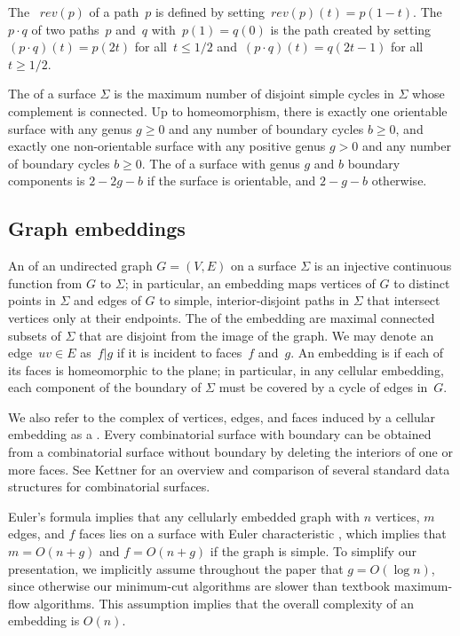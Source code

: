 \documentclass[letterpaper,review]{siamart190516}
\def\rev{\mathit{rev}}
\def\anote#1{\color{purple}Amir: #1 \color{black}}
\def\jnote#1{\textcolor{orange}{Jeff: #1}}
\begin{document}
The ~$\rev(p)$ of a path~$p$ is defined by
setting~$\rev(p)(t) = p(1-t)$. The ~$p \cdot q$ of two
paths~$p$ and~$q$ with~$p(1)=q(0)$ is the path created by
setting~$(p\cdot q)(t) = p(2t)$ for all~$t \leq 1/2$
and~$(p\cdot q)(t) = q(2t-1)$ for all~$t \geq 1/2$.

The  of a surface $\Sigma$ is the maximum number of disjoint simple cycles in $\Sigma$ whose complement is connected.
 Up to homeomorphism,
there is exactly one orientable surface with any genus $g\ge 0$ and any number of
boundary cycles $b\ge 0$, and exactly one non-orientable surface with any positive genus $g>0$ and any number of boundary cycles $b\ge 0$.
The  of a surface with genus $g$ and $b$ boundary components is ${2 - 2g - b}$ if the surface is orientable, and ${2 - g - b}$ otherwise.

\subsection{Graph embeddings}
\label{SS:embeddings}

An  of an undirected graph $G=(V,E)$ on a surface $\Sigma$ is an injective continuous function from $G$ to $\Sigma$; in particular, an embedding maps vertices of $G$ to distinct points in $\Sigma$ and edges of $G$ to simple, interior-disjoint paths in $\Sigma$ %
that intersect vertices only at their endpoints.
The  of the embedding are maximal connected subsets of $\Sigma$ that are disjoint from the image of the graph.
We may denote an edge~$uv \in E$ as~$f | g$ if it is incident to faces~$f$ and~$g$.
An embedding is  if each of its faces is homeomorphic to the plane; in particular, in any cellular embedding, each component of the boundary of $\Sigma$ must be covered by a cycle of edges in~$G$.  

We also refer to the complex of vertices, edges, and faces induced by a cellular embedding as a .  Every combinatorial surface with boundary can be obtained from a combinatorial surface without boundary by deleting the interiors of one or more faces.  See Kettner \cite{k-ugpdd-99} for an overview and comparison of several standard data structures for combinatorial surfaces. 

Euler's formula implies that any cellularly embedded graph with $n$ vertices, $m$ edges, and $f$ faces lies on a surface with Euler characteristic , which implies that $m = O(n+g)$ and $f=O(n+g)$ if the graph is simple.
To simplify our presentation, we implicitly assume throughout the paper that $g = O(\log n)$, since otherwise our minimum-cut algorithms are slower than textbook maximum-flow algorithms.  This assumption implies that the overall complexity of an embedding is $O(n)$.
\end{document}
